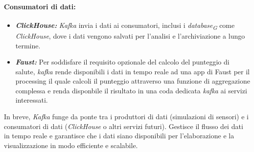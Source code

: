 \paragraph*{Consumatori di dati:}
\begin{itemize}
  \item \textbf{\textit{ClickHouse:}} \textit{Kafka} invia i dati ai consumatori, inclusi i \textit{database}\textsubscript{\textit{G}} come \textit{ClickHouse}, dove i dati vengono salvati per l'analisi e l'archiviazione a lungo termine.
  \item \textbf{\textit{Faust:}} Per soddisfare il requisito opzionale del calcolo del punteggio di salute, \textit{kafka} rende disponibili i dati in tempo reale ad una app di Faust per il processing il quale calcoli il punteggio attraverso una funzione di aggregazione complessa e renda  disponbile il risultato in una coda dedicata \textit{kafka} ai servizi interessati.
\end{itemize}

In breve, \textit{Kafka} funge da ponte tra i produttori di dati (simulazioni di sensori) e i consumatori di dati (\textit{ClickHouse} o altri servizi futuri). Gestisce il flusso dei dati in tempo reale e garantisce che i dati siano disponibili per l'elaborazione e la visualizzazione in modo efficiente e scalabile.